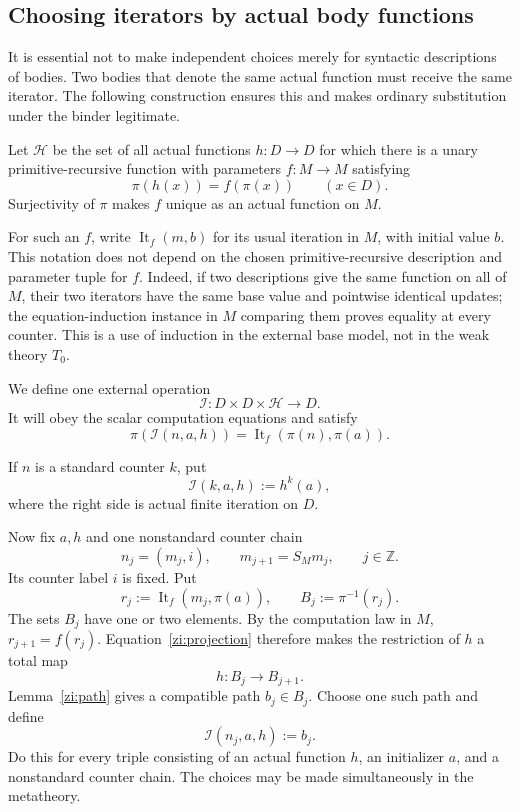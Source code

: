 \subsection{Choosing iterators by actual body functions}

It is essential not to make independent choices merely for syntactic descriptions of bodies. Two bodies that denote the same actual function must receive the same iterator. The following construction ensures this and makes ordinary substitution under the binder legitimate.

Let \(\mathscr H\) be the set of all actual functions \(h:D\to D\) for which there is a unary primitive-recursive function with parameters \(f:M\to M\) satisfying
\[
\pi(h(x))=f(\pi(x))\qquad(x\in D).
\tag{Projection}\label{zi:projection}
\]
Surjectivity of \(\pi\) makes \(f\) unique as an actual function on \(M\).

For such an \(f\), write \(\operatorname{It}_f(m,b)\) for its usual iteration in \(M\), with initial value \(b\). This notation does not depend on the chosen primitive-recursive description and parameter tuple for \(f\). Indeed, if two descriptions give the same function on all of \(M\), their two iterators have the same base value and pointwise identical updates; the equation-induction instance in \(M\) comparing them proves equality at every counter. This is a use of induction in the external base model, not in the weak theory \(T_0\).

We define one external operation
\[
\mathcal I:D\times D\times\mathscr H\longrightarrow D.
\]
It will obey the scalar computation equations and satisfy
\[
\pi(\mathcal I(n,a,h))
=\operatorname{It}_f(\pi(n),\pi(a)).
\tag{Iterator projection}\label{zi:it-projection}
\]

If \(n\) is a standard counter \(k\), put
\[
\mathcal I(k,a,h):=h^k(a),
\]
where the right side is actual finite iteration on \(D\).

Now fix \(a,h\) and one nonstandard counter chain
\[
n_j=(m_j,i),\qquad
m_{j+1}=S_Mm_j,\qquad j\in\mathbb Z.
\]
Its counter label \(i\) is fixed. Put
\[
r_j:=\operatorname{It}_f(m_j,\pi(a)),\qquad
B_j:=\pi^{-1}(r_j).
\]
The sets \(B_j\) have one or two elements. By the computation law in \(M\),
\(r_{j+1}=f(r_j)\). Equation~\eqref{zi:projection} therefore makes the restriction of \(h\) a total map
\[
h:B_j\longrightarrow B_{j+1}.
\]
Lemma~\ref{zi:path} gives a compatible path \(b_j\in B_j\). Choose one such path and define
\[
\mathcal I(n_j,a,h):=b_j.
\]
Do this for every triple consisting of an actual function \(h\), an initializer \(a\), and a nonstandard counter chain. The choices may be made simultaneously in the metatheory.

